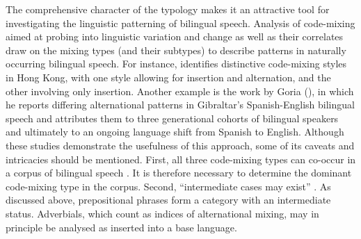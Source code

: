The comprehensive character of the typology makes it an attractive tool for investigating the linguistic patterning of bilingual speech. Analysis of code-mixing aimed at probing into linguistic variation and change as well as their correlates draw on the mixing types (and their subtypes) to describe patterns in naturally occurring bilingual speech. For instance, \citet[][]{chen-styling} identifies distinctive code-mixing styles in Hong Kong, with one style allowing for insertion and alternation, and the other involving only insertion. Another example is the work by Goria (\citeyear[][]{goria-inglese, goria-road}), in which he reports differing alternational patterns in Gibraltar's Spanish-English bilingual speech and attributes them to three generational cohorts of bilingual speakers and ultimately to an ongoing language shift from Spanish to English. Although these studies demonstrate the usefulness of this approach, some of its caveats and intricacies should be mentioned. First, all three code-mixing types can co-occur in a corpus of bilingual speech \citep[229]{muysken-bilingual-2000}. It is therefore necessary to determine the dominant code-mixing type in the corpus. Second, ``intermediate cases may exist'' \citep[229]{muysken-bilingual-2000}. As discussed above, prepositional phrases form a category with an intermediate status. Adverbials, which count as indices of alternational mixing, may in principle be analysed as inserted into a base language. %


